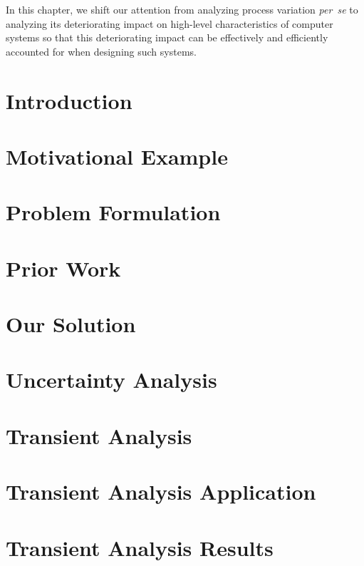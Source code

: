In this chapter, we shift our attention from analyzing process variation
\emph{per~se} to analyzing its deteriorating impact on high-level
characteristics of computer systems so that this deteriorating impact can be
effectively and efficiently accounted for when designing such systems.

\section{Introduction}

\section{Motivational Example}

\section{Problem Formulation}

\section{Prior Work}

\section{Our Solution}

\section{Uncertainty Analysis}

\section{Transient Analysis}

\section{Transient Analysis Application}

\section{Transient Analysis Results}

